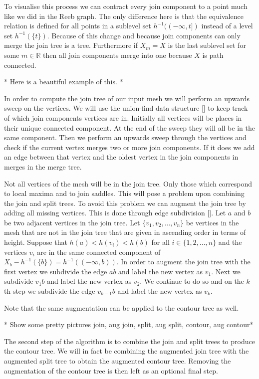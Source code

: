 To visualise this process we can contract every join component to a point much like we did in the Reeb graph. The only difference here is that the equivalence relation is defined for all points in a sublevel set $h^{-1}((-\infty, t])$ instead of a level set $h^{-1}(\{t\})$. Because of this change and because join components can only merge the join tree is a tree. Furthermore if $X_m = X$ is the last sublevel set for some $m \in \mathbb{R}$ then all join components merge into one because $X$ is path connected.

* Here is a beautiful example of this. *

In order to compute the join tree of our input mesh we will perform an upwards sweep on the vertices. We will use the union-find data structure [] to keep track of which join components vertices are in. Initially all vertices will be places in their unique connected component. At the end of the sweep they will all be in the same component. Then we perform an upwards sweep through the vertices and check if the current vertex merges two or more join components. If it does we add an edge between that vertex and the oldest vertex in the join components in merges in the merge tree.


Not all vertices of the mesh will be in the join tree. Only those which correspond to local maxima and to join saddles. This will pose a problem upon combining the join and split trees. To avoid this problem we can augment the join tree by adding all missing vertices. This is done through edge subdivision []. Let $a \text{ and } b$ be two adjacent vertices in the join tree.  Let $\{v_1, v_2, ..., v_n\}$ be vertices in the mesh that are not in the join tree that are given in ascending order in terms of height.  Suppose that $h(a) < h(v_i) < h(b)$ for all $i \in \{1, 2, ..., n\}$ and the vertices $v_i$ are in the same connected component of $X_b - h^{-1}(\{b\}) = h^{-1}((-\infty, b))$. In order to augment the join tree with the first vertex we subdivide the edge $ab$ and label the new vertex as $v_1$. Next we subdivide $v_1b$ and label the new vertex as $v_2$. We continue to do so and on the $k$th step we subdivide the edge $v_{k-1}b$ and label the new vertex as $v_k$.

Note that the same augmentation can be applied to the contour tree as well.

* Show some pretty pictures join, aug join, split, aug split, contour, aug contour*

The second step of the algorithm is to combine the join and split trees to produce the contour tree. We will in fact be combining the augmented join tree with the augmented split tree to obtain the augmented contour tree. Removing the augmentation of the contour tree is then left as an optional final step.

